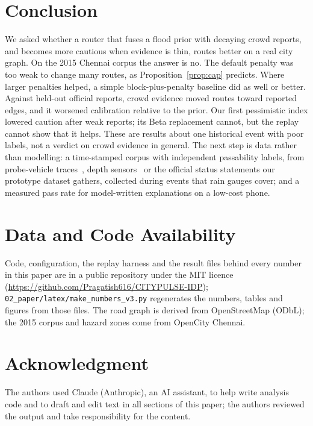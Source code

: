 \documentclass[conference]{IEEEtran}
\begin{document}
\section{Conclusion}
We asked whether a router that fuses a flood prior with decaying crowd reports, and becomes more cautious when evidence is thin, routes better on a real city graph. On the 2015 Chennai corpus the answer is no. The default penalty was too weak to change many routes, as Proposition~\ref{prop:cap} predicts. Where larger penalties helped, a simple block-plus-penalty baseline did as well or better. Against held-out official reports, crowd evidence moved routes toward reported edges, and it worsened calibration relative to the prior. Our first pessimistic index lowered caution after weak reports; its Beta replacement cannot, but the replay cannot show that it helps. These are results about one historical event with poor labels, not a verdict on crowd evidence in general. The next step is data rather than modelling: a time-stamped corpus with independent passability labels, from probe-vehicle traces~\cite{hiramoto2025probe,pietrobon2019closure}, depth sensors~\cite{mydlarz2024floodnet} or the official status statements our prototype dataset gathers, collected during events that rain gauges cover; and a measured pass rate for model-written explanations on a low-cost phone.

\section*{Data and Code Availability}
Code, configuration, the replay harness and the result files behind every number in this paper are in a public repository under the MIT licence (\url{https://github.com/Pragatish616/CITYPULSE-IDP}); \texttt{02\_paper/latex/make\_numbers\_v3.py} regenerates the numbers, tables and figures from those files. The road graph is derived from OpenStreetMap (ODbL); the 2015 corpus and hazard zones come from OpenCity Chennai.

\section*{Acknowledgment}
The authors used Claude (Anthropic), an AI assistant, to help write analysis code and to draft and edit text in all sections of this paper; the authors reviewed the output and take responsibility for the content.



\end{document}

